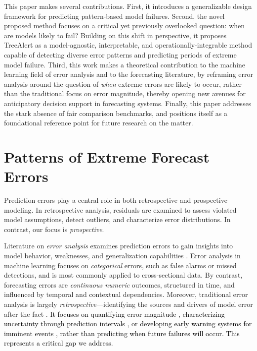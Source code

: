 \documentclass[12pt]{article}
\newcommand{\matt}[1]{\textcolor{black}{#1}}
\begin{document}
This paper makes several contributions. First, it introduces a generalizable design framework for predicting pattern-based model failures. Second, %
the novel proposed method %
focuses on a critical yet previously overlooked question: when are models likely to fail? Building on this shift in perspective, it proposes TreeAlert as a model-agnostic, interpretable, and operationally-integrable method capable of detecting diverse error patterns and predicting periods of extreme model failure. Third, this work makes a theoretical contribution to the machine learning field of error analysis and to the forecasting literature, by reframing error analysis around the question of \emph{when} extreme errors are likely to occur, rather than the traditional focus on error magnitude, thereby opening new avenues for anticipatory decision support in forecasting systems. Finally, %
this paper addresses the stark absence of fair comparison benchmarks, and %
positions itself as %
a foundational reference point for future research on the matter.

\section{Patterns of Extreme Forecast Errors}
\label{sec:patterns}
Prediction errors play a central role in both retrospective and prospective modeling. In retrospective analysis, residuals are examined to assess violated model assumptions, detect outliers, and characterize error distributions. In contrast, our focus is \emph{prospective}. %

Literature on \emph{error analysis} examines prediction errors to gain insights into model behavior, weaknesses, and  generalization capabilities \citep{cakmak2024}. %
Error analysis in machine learning focuses on %
\emph{categorical} errors, such as false alarms or missed detections, and is most commonly applied to cross-sectional data. By contrast, forecasting errors are \emph{continuous numeric} outcomes, structured in time, and influenced by temporal and contextual dependencies. Moreover, traditional error analysis is largely \emph{retrospective}—identifying the sources and drivers of model error after the fact \citep{cakmak2024}. \matt{It focuses on quantifying error magnitude \citep{kim2020}, characterizing uncertainty through prediction intervals \citep{salem2020}, or developing early warning systems for imminent events \citep{shmueli2010}, rather than predicting when future failures will occur. This represents a critical gap we address.}
\end{document}
